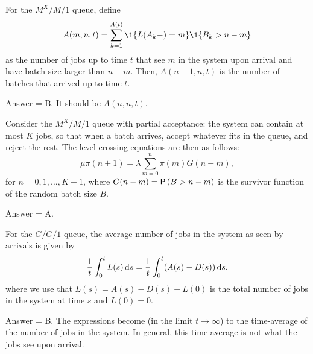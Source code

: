 \begin{exercise}[201803]
For the $M^X/M/1$ queue, define 
\begin{equation*}
  A(m,n,t) = \sum_{k=1}^{A(t)}\1{L(A_k-) = m}\1{B_k > n-m}
\end{equation*}
as the number of jobs up to time $t$ that see $m$ in the system upon
arrival and have batch size larger than $n-m$.  Then, $A(n-1, n, t)$ is the number of batches that arrived up to time $t$. 
\begin{solution}
Answer = B. It should be $A(n, n,t)$.
\end{solution}
\end{exercise}

\begin{exercise}[201803]
Consider the $M^X/M/1$ queue with partial acceptance: the system can contain at most $K$ jobs, so that when a batch arrives,  accept whatever fits in the queue, and reject the rest.
The level crossing equations are then as follows:
  \begin{equation*}
    \mu \pi(n+1) = \lambda \sum_{m=0}^n \pi(m) G(n-m), 
  \end{equation*}
  for $n=0,1,\ldots, K-1$, where $G(n-m)=\P{B>n-m}$ is the survivor function of the random batch size $B$.
\begin{solution}
Answer = A.

\end{solution}
\end{exercise}

\begin{exercise}[201804]
For the $G/G/1$ queue,  the average number of
jobs in the system as seen by arrivals is given by
\begin{equation}\label{eq:11}
\frac 1 t\int_0^t L(s)\,\text{d}s =  \frac 1 t\int_0^t (A(s)-D(s)) \,\text{d}s,
\end{equation}
where we use that $L(s)=A(s) - D(s) + L(0)$ is the total number of jobs in
the system at time $s$ and $L(0)=0$.
\begin{solution}
Answer = B.  The expressions become (in the limit $t\to\infty$) to the time-average of the number of jobs in the system.  In general, this time-average is not what the jobs see upon arrival.
\end{solution}
\end{exercise}


